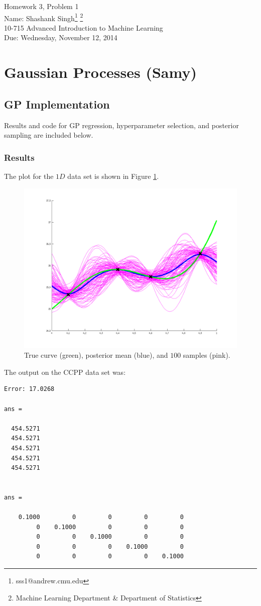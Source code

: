 \documentclass[11pt]{article}
\makeatletter
\newcommand{\myname}{Shashank Singh\footnote{sss1@andrew.cmu.edu}
        \footnote{Machine Learning Department \& Department of Statistics}}
\newcommand{\myclass}{10-715 Advanced Introduction to Machine Learning}
\newcommand{\myhwnum}{3}
\newcommand{\duedate}{Wednesday, November 12, 2014}
\makeatother
\begin{document}
\thispagestyle{plain}

{\Large Homework \myhwnum, Problem 1} \\
Name: \myname \\
\myclass \\
Due: \duedate

\section{Gaussian Processes (Samy)}
\subsection{GP Implementation}
Results and code for GP regression, hyperparameter selection, and posterior
sampling are included below.
\subsubsection*{Results}
The plot for the $1D$ data set is shown in Figure \ref{fig:GP1}.
\begin{figure}[h!]
\centering
\quad\;
\includegraphics[width=0.75\linewidth]{GP1}
\vspace{-12mm}
\caption{True curve (green), posterior mean (blue), and $100$ samples (pink).}
\label{fig:GP1}
\end{figure}

The output on the CCPP data set was:
\begin{verbatim}
Error: 17.0268

ans =

  454.5271
  454.5271
  454.5271
  454.5271
  454.5271


ans =

    0.1000         0         0         0         0
         0    0.1000         0         0         0
         0         0    0.1000         0         0
         0         0         0    0.1000         0
         0         0         0         0    0.1000
\end{verbatim}
\end{document}
